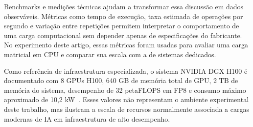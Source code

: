Benchmarks e medições técnicas ajudam a transformar essa discussão em dados observáveis. Métricas como tempo de execução, taxa estimada de operações por segundo e variação entre repetições permitem interpretar o comportamento de uma carga computacional sem depender apenas de especificações do fabricante. No experimento deste artigo, essas métricas foram usadas para avaliar uma carga matricial em CPU e comparar sua escala com a de sistemas dedicados.

Como referência de infraestrutura especializada, o sistema NVIDIA DGX H100 é documentado com 8 GPUs H100, 640 GB de memória total de GPU, 2 TB de memória do sistema, desempenho de 32 petaFLOPS em FP8 e consumo máximo aproximado de 10,2 kW~\cite{nvidiaDgxH100}. Esses valores não representam o ambiente experimental deste trabalho, mas ilustram a escala de recursos normalmente associada a cargas modernas de IA em infraestrutura de alto desempenho.
